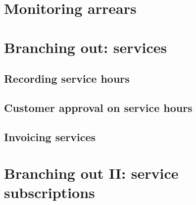 


\chapter{Monitoring arrears}
\label{cha-starting-monitoring-arrears}


\chapter{Branching out: services}
\label{cha-starting-branch-to-services}



\section{Recording service hours}
\label{sec-starting-services-writing-hours}

\section{Customer approval on service hours}
\label{sec-starting-services-hours-customer-approval}

\section{Invoicing services}
\label{sec-starting-services-invoicing}

\chapter{Branching out II: service subscriptions}
\label{cha-starting-services-subscriptions}

